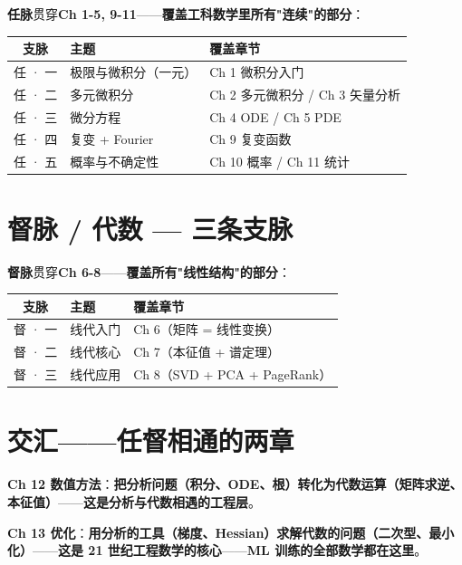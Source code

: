 \textbf{任脉}贯穿\textbf{Ch 1-5, 9-11}——\textbf{覆盖工科数学里所有"连续"的部分}：

\begin{center}
\begin{tabular}{|c|p{4.5cm}|p{5.5cm}|}
\hline
\textbf{支脉} & \textbf{主题} & \textbf{覆盖章节} \\
\hline
任 · 一 & 极限与微积分（一元） & Ch 1 微积分入门 \\
\hline
任 · 二 & 多元微积分 & Ch 2 多元微积分 / Ch 3 矢量分析 \\
\hline
任 · 三 & 微分方程 & Ch 4 ODE / Ch 5 PDE \\
\hline
任 · 四 & 复变 + Fourier & Ch 9 复变函数 \\
\hline
任 · 五 & 概率与不确定性 & Ch 10 概率 / Ch 11 统计 \\
\hline
\end{tabular}
\end{center}

\section*{督脉 / 代数 — 三条支脉}

\textbf{督脉}贯穿\textbf{Ch 6-8}——\textbf{覆盖所有"线性结构"的部分}：

\begin{center}
\begin{tabular}{|c|p{4.5cm}|p{5.5cm}|}
\hline
\textbf{支脉} & \textbf{主题} & \textbf{覆盖章节} \\
\hline
督 · 一 & 线代入门 & Ch 6（矩阵 = 线性变换） \\
\hline
督 · 二 & 线代核心 & Ch 7（本征值 + 谱定理） \\
\hline
督 · 三 & 线代应用 & Ch 8（SVD + PCA + PageRank） \\
\hline
\end{tabular}
\end{center}

\section*{交汇——任督相通的两章}

\textbf{Ch 12 数值方法}：\textbf{把分析问题（积分、ODE、根）转化为代数运算（矩阵求逆、本征值）}——\textbf{这是分析与代数相遇的工程层}。

\textbf{Ch 13 优化}：\textbf{用分析的工具（梯度、Hessian）求解代数的问题（二次型、最小化）}——\textbf{这是 21 世纪工程数学的核心}——\textbf{ML 训练的全部数学都在这里}。

